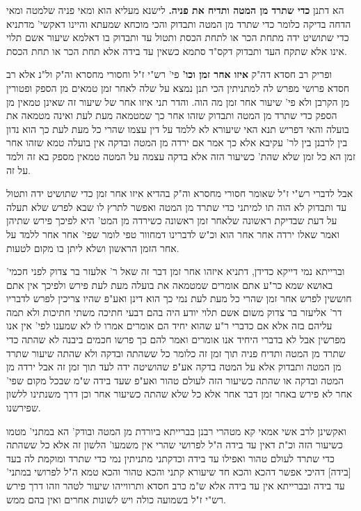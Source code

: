 \documentclass[12pt, openany]{book}
\newcommand{\sethebfont}{
\fontsize{10.5pt}{21.0pt} \selectfont
}
\newcommand{\twocol}[1]{
	{\sethebfont \begin{multicols}{2}
			#1
	\end{multicols}}	
}
\begin{document}
\twocol{הא דתנן \textbf{כדי שתרד מן המטה ותדיח את פניה.}  לישנא מעליא הוא ומאי פניה שלמטה ומאי הדחה בדיקה כלומר כדי שתרד מן המטה ותבדוק והכי מוכחא שמעתא והיינו דאקשי' מדתניא כדי שתושיט ידה מתחת הכר או לתחת הכסת ותטול עד ותבדוק בו דאלמא שיעור אשם תלוי אינו אלא שתקח העד ותבדוק דקס"ד סתמא כשאין עד בידה אלא תחת הכר או תחת הכסת. 
\par ופריק רב חסדא דה"ק \textbf{איזו אחר זמן וכו'}  פי' רש"י ז"ל וחסורי מחסרא וה"ק ול"נ אלא רב חסדא פרושי מפרש לה למתניתין הכי תנן נמצא על שלה לאחר זמן טמאים מן הספק ופטורין מן הקרבן ולא פי' שיעור אחר זמן מה הוה. והדר תני איזו אחר של שיעור זה שאינן טמאין מן הספק כדי שתרד מן המטה ותבדוק שזהו אחר כך שמטמאה מעת לעת ואינה מטמאה את בועלה והאי דפריש תנא האי שיעורא לא ללמד על דין עצמו שהרי כל מעת לעת כך הוא נדון בין לרבנן בין לר' עקיבא אלא כך אמר אם ירדה מן המטה ובדקה אין בועלה טמא שזהו אחר זמן הא כל זמן שלא שהת' כשיעור הזה אלא בדקה עצמה על המטה טמאין מספק בא זה ולמד על זה.\par  אבל לדברי רש"י ז"ל שאומר חסורי מחסרא וה"ק בהדיא איזו אחר זמן כדי שתושיט ידה ותטול עד ותבדוק לא הוה תו למיתני כדי שתרד מן המטה ואפשר לתרץ לו שבא לפרש שלא תעלה על דעת שבדיקת ראשונה שלאחר זמן ראשונה כשירדה מן המט' היא לפיכך פירש שתיהן ואמר שאלו ירדה אחר אחר הוא וכ"ש לדברינו דמחוור טפי לומר שפי' אחר אחר ללמד על אחר הזמן הראשון ושלא ליתן בו מקום לטעות.\par  וברייתא נמי דייקא כדידן, דתניא איזהו אחר זמן דבר זה שאל ר' אלעזר בר צדוק לפני חכמי' באושא שמא כר"ע אתם אומרים שמטמאה את בועלה מעת לעת פירש ולפיכך אין אתם חוששין לפרש אחר זמן שהרי כל מעת לעת נמי כך הוא דינן ואע"פ שהיו צריכין לפרש לדבריו דר' אליעזר בר צדוק משום אשם תלוי יודע היה בהם דבעי חתיכה משתי חתיכות ולא תמה עליהם בזה אלא אם כדברי ר"ע שהוא יחיד הם אומרים אמרו לו לא שמענו לפי' אין אנו מפרשין אבל לא בדברי היחיד אנו אומרים ואמר להם כך פרשו חכמים ביבנה לא שהתה כדי שתרד מן המטה ותדיח פניה תוך זמן זה כלומר כל ששהתה ובדקה ולא שהתה שיעור שתרד מן המטה ותבדוק אלא על המטה בדקה אע"פ שהושיטה ידה לעד תוך זמן זה אבל ירדה מן המטה ובדקה או שהתה כשיעור הזה לעולם טהור ואע"פ שעד בידה ש"מ שבכל מקום שפי' אחר לא פירש באחר זמן דבר אחר אלא כל שלא שהתה כשיעור אחר וכן דרך משנתינו ללשון שפירשנו.\par  ואקשינן לרב אשי אמאי קא מטהרי רבנן בברייתא ביורדת מן המטה ובודק' הא במתני' מטמו כשיעור הזה וכ"ת דאין עד בידה ה"ל לפרושי שהרי אין משמעו' הלשון זה אלא כל ששהתה כדי שתרד לעולם טהור ואפילו עד בידה וכדקתני מתניתין נמי כדי שתרד ומוקמת לה בעד [בידה] דהיכי אפשר דהכא והכא חד שיעורא קתני והכא טהור והכא טמא ה"ל לפרושי במתני' עד בידה ובברייתא אין עד בידה אלא ש"מ כרב חסדא ותרווייהו שיעור לטהר וזהו דרך פירש רש"י ז"ל בשמועה כולה ויש לשונות אחרים ואין בהם ממש. 
\par}
\end{document}
